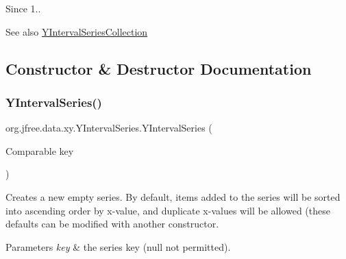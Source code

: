 \begin{DoxySince}{Since}
1..
\end{DoxySince}
\begin{DoxySeeAlso}{See also}
\mbox{\hyperlink{classorg_1_1jfree_1_1data_1_1xy_1_1_y_interval_series_collection}{Y\+Interval\+Series\+Collection}} 
\end{DoxySeeAlso}


\subsection{Constructor \& Destructor Documentation}
\mbox{\label{classorg_1_1jfree_1_1data_1_1xy_1_1_y_interval_series_a7f10d1fd04a70b32bc26fd3dc1c0d299}} 
\subsubsection{\texorpdfstring{Y\+Interval\+Series()}{YIntervalSeries()}\hspace{0.1cm}{\footnotesize\ttfamily [1/2]}}
{\footnotesize\ttfamily org.\+jfree.\+data.\+xy.\+Y\+Interval\+Series.\+Y\+Interval\+Series (\begin{DoxyParamCaption}\item[{Comparable}]{key }\end{DoxyParamCaption})}

Creates a new empty series. By default, items added to the series will be sorted into ascending order by x-\/value, and duplicate x-\/values will be allowed (these defaults can be modified with another constructor.


\begin{DoxyParams}{Parameters}
{\em key} & the series key ({\ttfamily null} not permitted). \\
\hline
\end{DoxyParams}
\mbox{\label{classorg_1_1jfree_1_1data_1_1xy_1_1_y_interval_series_abe2bb7bd9b4279a570eed708be039bfa}} 
